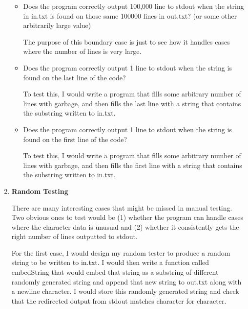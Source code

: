 \documentclass[11pt,letterpaper]{article}
\begin{document}
\begin{enumerate}[label=\arabic*.]
\begin{itemize}
        \item Does the program correctly output 100,000 line to stdout
          when the string in in.txt is found on those same 100000 lines in
          out.txt? (or some other arbitrarily large value)

            The purpose of this boundary case is 
            just to see how it handles cases where the number of 
            lines is very large. 

          \item Does the program correctly output 1 line to stdout when the
            string is found on the last line of the code? 

            To test this, I would write a program that fills some arbitrary
            number of lines with garbage, and then fills the last line 
            with a string that contains the substring written to in.txt. 

          \item Does the program correctly output 1 line to stdout when
            the string is found on the first line of the code? 

            To test this, I would write a program that fills some arbitrary
            number of lines with garbage, and then fills the first line 
            with a string that contains the substring written to in.txt. 

    \end{itemize}

  \item \textbf{Random Testing}

    There are many interesting cases that might be missed in manual testing. Two 
    obvious ones to test would be (1) whether the program can handle cases where
    the character data is unusual and (2) whether it consistently gets the right
    number of lines outputted to stdout. 

    For the first case, I would design my random tester to produce a random string
    to be written to in.txt. I would then write a function called embedString that
    would embed that string as a substring of different randomly generated string and
    append that new string to out.txt along with a newline character. I would
    store this randomly generated string and check that the redirected output from
    stdout matches character for character. 
    

\end{enumerate}
\end{document}
